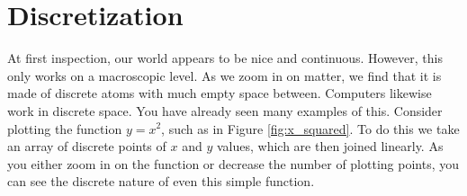 \label{lab:spgrid}


\section*{Discretization}
At first inspection, our world appears to be nice and continuous.  However, this only works on a macroscopic level.  As we zoom in on matter, we find that it is made of discrete atoms with much empty space between.  Computers likewise work in discrete space.  You have already seen many examples of this.  Consider plotting the function $y=x^2$, such as in Figure \ref{fig:x_squared}.  To do this we take an array of discrete points of $x$ and $y$ values, which are then joined linearly.  As you either zoom in on the function or decrease the number of plotting points, you can see the discrete nature of even this simple function.


